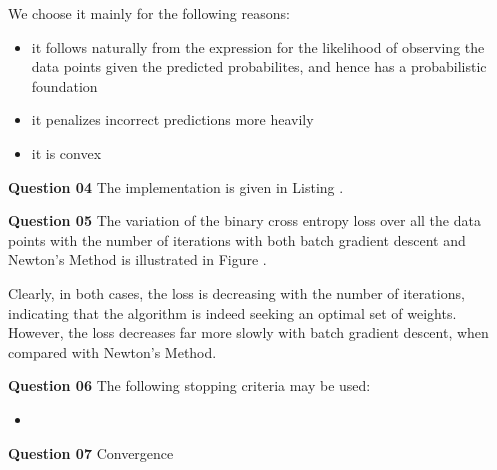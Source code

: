 \documentclass{article}[a4paper]
\begin{document}
	We choose it mainly for the following reasons:
	\begin{itemize}[noitemsep]
		\item it follows naturally from the expression for the likelihood of observing the data points given the predicted probabilites, and hence has a probabilistic foundation
		\item it penalizes incorrect predictions more heavily
		\item it is convex
	\end{itemize}
	\medskip

	\textbf{Question 04} The implementation is given in Listing .
	\medskip

	\textbf{Question 05} The variation of the binary cross entropy loss over all the data points with the number of iterations with both batch gradient descent and Newton's Method is illustrated in Figure .

	Clearly, in both cases, the loss is decreasing with the number of iterations, indicating that the algorithm is indeed seeking an optimal set of weights. However, the loss decreases far more slowly with batch gradient descent, when compared with Newton's Method.
	\medskip

	\textbf{Question 06} The following stopping criteria may be used:
	\begin{itemize}
		\item 
	\end{itemize}
	\medskip

	\textbf{Question 07} Convergence
\end{document}
